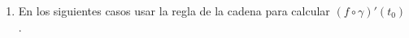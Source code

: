 \documentclass[11pt]{book}
\newcounter{cuent}
\theoremstyle{definicion}
\theoremstyle{teorema}
\theoremstyle{ejemplo}
\begin{document}
\begin{enumerate}



%





\item En los siguientes casos usar la regla de la cadena para calcular $(f\circ \gamma)'(t_0)$.


\end{enumerate}
\end{document}
